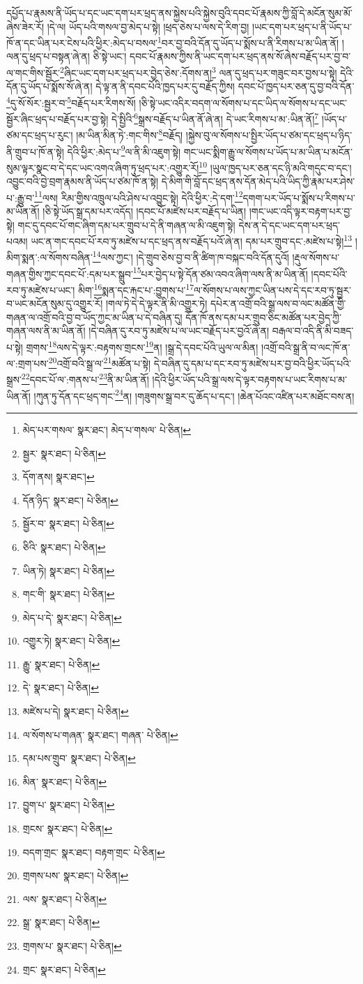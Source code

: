 དཔྱོད་པ་རྣམས་ནི་ཡོད་པ་དང་ཡང་དག་པར་ཕྲད་ནས་སྐྱེས་པའི་སྐྱེས་བུའི་དབང་པོ་རྣམས་ཀྱི་བློ་དེ་མངོན་སུམ་མོ་ཞེས་ཟེར་རོ། །དེ་ལ། ཡོད་པའི་གསལ་བྱ་མེད་པ་སྟེ། །ཕྲད་ཅེས་པ་ལས་དེ་རིག་བྱ། །ཡང་དག་པར་ཕྲད་པ་ནི་ཡོད་པ་ཁོ་ན་དང་ཡིན་པར་ངེས་པའི་ཕྱིར་:མེད་པ་བསལ་\footnote{མེད་པར་གསལ་  སྣར་ཐང་། མེད་པ་གསལ་  པེ་ཅིན། }བར་བྱ་བའི་དོན་དུ་ཡོད་པ་སྨོས་པ་ནི་རིགས་པ་མ་ཡིན་ནོ། །ལན་དུ་ཕྲད་པ་བསྟན་ཞེ་ན། ཅི་སྟེ་ཡང་། དབང་པོ་རྣམས་ཀྱིས་ནི་ཡང་དག་པར་ཕྲད་ནས་སོ་ཞེས་བརྗོད་པར་བྱ་བ་ལ་གང་གིས་སྦྱོར་\footnote{སྦྱར་  སྣར་ཐང་།  པེ་ཅིན། }ཞིང་ཡང་དག་པར་ཕྲད་པར་བྱེད་ཅེས་:དོགས་ན།\footnote{དོག་ནས།  སྣར་ཐང་། } ལན་དུ་ཕྲད་པར་གཟུང་བར་བྱས་པ་སྟེ། དེའི་དོན་དུ་ཡོད་པ་སྨོས་སོ་ཞེ་ན། དེ་ལྟ་ན་ནི་དབང་པོའི་ཁྱད་པར་དུ་བརྗོད་ཀྱིས། དབང་པོ་ཁྱད་པར་ཅན་དུ་བྱ་བའི་དོན་\footnote{དོན་ཉིད་  སྣར་ཐང་།  པེ་ཅིན། }དུ་སོ་སོར་:སྦྱར་བ་\footnote{སྦྱོར་བ་  སྣར་ཐང་།  པེ་ཅིན། }བརྗོད་པར་རིགས་སོ། །ཅི་སྟེ་ཡང་འདིར་བདག་ལ་སོགས་པ་དང་ཡིད་ལ་སོགས་པ་དང་ཡང་སྦྱོར་ཞིང་ཕྲད་པ་བརྗོད་པར་བྱ་སྟེ། དེ་སྤྱིའི་\footnote{ཅིའི་  སྣར་ཐང་།  པེ་ཅིན། }སྒྲས་བརྗོད་པ་ཡིན་ནོ་ཞེ་ན། དེ་ཡང་རིགས་པ་མ་:ཡིན་ནོ།\footnote{ཡིན་ཏེ།  སྣར་ཐང་།  པེ་ཅིན། } །ཡོད་པ་ཙམ་དང་ཕྲད་པ་རུང་། །མ་ཡིན་མིན་ཏེ་:གང་གིས་\footnote{གང་གི་  སྣར་ཐང་།  པེ་ཅིན། }བརྗོད། །སྐྱེས་བུ་ལ་སོགས་པ་སྤྱིར་ཡོད་པ་ཙམ་དང་ཕྲད་པ་ཉིད་ནི་གྲུབ་པ་ཁོ་ན་སྟེ། དེའི་ཕྱིར་:མེད་པ་\footnote{མེད་པ་དེ་  སྣར་ཐང་།  པེ་ཅིན། }ལ་ནི་མི་འཇུག་སྟེ། གང་ཡང་སྨིག་རྒྱུ་ལ་སོགས་པ་ཡོད་པ་མ་ཡིན་པ་མངོན་སུམ་ལྟར་སྣང་བ་དེ་དང་ཡང་འགའ་ཞིག་ཏུ་ཕྲད་པར་:འགྱུར་རོ།\footnote{འགྱུར་ཏེ།  སྣར་ཐང་།  པེ་ཅིན། } །ཡུལ་ཁྱད་པར་ཅན་དང་ཉི་མའི་གདུང་བ་དང་། འབྱུང་བའི་བྱེ་བྲག་རྣམས་ནི་ཡོད་པ་ཙམ་ཁོ་ན་སྟེ། དེ་མིག་གི་བློ་དང་ཕྲད་ནས་དོན་མེད་པའི་ཡིད་ཀྱི་རྣམ་པར་ཤེས་པ་:རྒྱུ་བ་\footnote{རྒྱུ་  སྣར་ཐང་།  པེ་ཅིན། }ལས། རིམ་གྱིས་འཁྲུལ་པའི་ཤེས་པ་འབྱུང་སྟེ། དེའི་ཕྱིར་:དེ་དག་\footnote{དེ་  སྣར་ཐང་།  པེ་ཅིན། }དགག་པར་ཡོད་པ་སྨོས་པ་རིགས་པ་མ་ཡིན་ནོ། །ཅི་སྟེ་ཡོད་སྒྲ་དམ་པར་འདོད། །དབང་པོ་མཛེས་པར་བརྗོད་པ་ཡིན། །གང་ཡང་འདི་ལྟར་བརྟག་པར་བྱ་སྟེ། གང་དུ་དབང་པོ་གང་ཞིག་དམ་པར་གྲུབ་པ་དེ་ནི་གཞན་ལ་མི་འཇུག་སྟེ། དེས་ན་དེ་དང་ཡང་དག་པར་ཕྲད་པའམ། ཡང་ན་གང་དབང་པོ་རབ་ཏུ་མཛེས་པ་དང་ཕྲད་ནས་བརྗོད་པའོ་ཞེ་ན། དམ་པར་གྲུབ་དང་:མཛེས་པ་སྟེ།\footnote{མཛེས་པ་དེ།  སྣར་ཐང་།  པེ་ཅིན། } །མིག་སྨན་:ལ་སོགས་བཞིན་\footnote{ལ་སོགས་པ་གཞན་  སྣར་ཐང་། གཞན་  པེ་ཅིན། }ལས་ཀྱང་། །དེ་གྲུབ་ཅེས་བྱ་བ་ནི་ཚིག་ཁ་བསྐང་བའི་དོན་དུའོ། །རྡུལ་སོགས་པ་གཞན་གྱིས་ཀྱང་དབང་པོ་:དམ་པར་སྒྲུབ་\footnote{དམ་པས་གྲུབ་  སྣར་ཐང་།  པེ་ཅིན། }པར་བྱེད་པ་སྟེ་དོན་ཙམ་འབའ་ཞིག་ལས་ནི་མ་ཡིན་ནོ། །དབང་པོའི་རབ་ཏུ་མཛེས་པ་ཡང་། མིག་\footnote{མིན་  སྣར་ཐང་།  པེ་ཅིན། }སྨན་དང་རྐང་པ་:བྱུགས་པ་\footnote{བྱུག་པ་  སྣར་ཐང་།  པེ་ཅིན། }ལ་སོགས་པ་ལས་ཀྱང་ཡིན་པས་དེ་དང་རབ་ཏུ་སྦྱར་བ་ཡང་མངོན་སུམ་དུ་འགྱུར་རོ། །གལ་ཏེ་དེ་དེ་ལྟར་ནི་མི་འགྱུར་ཏེ། དཔེར་ན་འགྲོ་བའི་སྒྲ་ལས་བ་ལང་མཚོན་གྱི་གཞན་ལ་འགྲོ་བའི་བྱ་བ་ཡོད་ཀྱང་མ་ཡིན་པ་དེ་བཞིན་དུ། དོན་ཁོ་ནས་དམ་པར་གྲུབ་ཅིང་མཚོན་པར་བྱེད་ཀྱི་གཞན་ལས་ནི་མ་ཡིན་ནོ། །དེ་བཞིན་དུ་རབ་ཏུ་མཛེས་པ་ལ་ཡང་བརྗོད་པར་བྱའོ་ཞེ་ན། བརྒལ་བ་འདི་ནི་མི་བཟད་པ་སྟེ། གྲགས་\footnote{གྲངས་  སྣར་ཐང་།  པེ་ཅིན། }ལས་དེ་ལྟར་:བརྟགས་གྲངས་\footnote{བདག་གྲང་  སྣར་ཐང་། བརྟག་གྲང་  པེ་ཅིན། }ན། །སྒྲ་དེ་དབང་པོའི་ཡུལ་ལ་མིན། །འགྲོ་བའི་སྒྲ་ནི་བ་ལང་ཁོ་ན་ལ་:གྲག་པས་\footnote{གྲགས་པས་  སྣར་ཐང་།  པེ་ཅིན། }འགྲོ་བའི་སྒྲ་ལ་\footnote{ལས་  སྣར་ཐང་།  པེ་ཅིན། }མཚོན་པ་སྟེ། དེ་བཞིན་དུ་དམ་པ་དང་རབ་ཏུ་མཛེས་པར་བྱ་བའི་ཕྱིར་ཡོད་པའི་སྒྲས་\footnote{སྒྲ་  སྣར་ཐང་།  པེ་ཅིན། }དབང་པོ་ལ་:གནས་པ་\footnote{གྲགས་པ་  སྣར་ཐང་།  པེ་ཅིན། }ནི་མ་ཡིན་ནོ། །དེའི་ཕྱིར་ཡོད་པའི་སྒྲ་ལས་དེ་ལྟར་བརྟགས་པ་ཡང་རིགས་པ་མ་ཡིན་ནོ། །ཀུན་ཏུ་དོན་དང་ཕྲད་གང་\footnote{གྲང་  སྣར་ཐང་།  པེ་ཅིན། }ན། །གཟུགས་སྒྲ་བར་དུ་ཆོད་པ་དང་། །ཆེན་པོའང་འཛིན་པར་མཐོང་བས་ན། 
